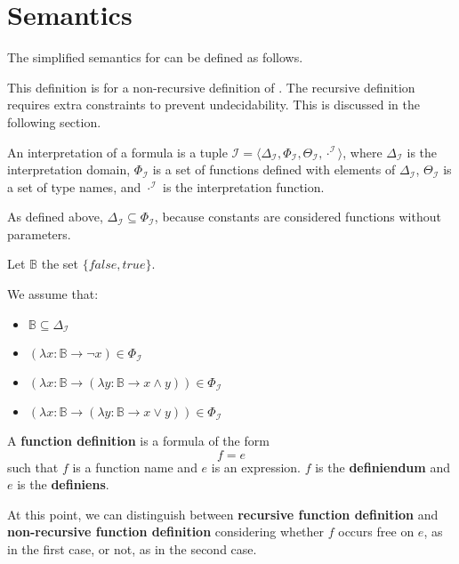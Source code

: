 \section{Semantics}

\newcommand{\I}[1]{\ensuremath{{#1}^{\mathcal{I}}}}

\newcommand{\DeltaI}{\ensuremath{\Delta _{\mathcal{I}}}}
\newcommand{\ThetaI}{\ensuremath{\Theta _{\mathcal{I}}}}
\newcommand{\PhiI}{\ensuremath{\Phi _{\mathcal{I}}}}

\newcommand{\lambd}[2]{\ensuremath{(\lambda {#1} \to {#2})}}

The simplified semantics for \Soda can be defined as follows.

This definition is for a non-recursive definition of \Soda.
The recursive definition requires extra constraints to prevent undecidability.
This is discussed in the following section.

An interpretation of a \Soda formula is a tuple $\mathcal{I} = \langle \DeltaI, \PhiI, \ThetaI, \I{\cdot} \rangle$, where $\DeltaI$ is the interpretation domain, $\PhiI$ is a set of functions defined with elements of $\DeltaI$, $\ThetaI$ is a set of type names, and $\I{\cdot}$ is the interpretation function.

As defined above, $\DeltaI \subseteq \PhiI$, because constants are considered functions without parameters.

Let $\mathbb{B}$ the set $\{false, true\}$.

We assume that:
\begin{itemize}
    \item $\mathbb{B} \subseteq \DeltaI$
    \item $\lambd{x: \mathbb{B}}{\lnot x} \in \PhiI$
    \item $\lambd{x: \mathbb{B}}{\lambd{y: \mathbb{B}}{x \land y}} \in \PhiI$
    \item $\lambd{x: \mathbb{B}}{\lambd{y: \mathbb{B}}{x \lor y}} \in \PhiI$
\end{itemize}

A \textbf{function definition} is a formula of the form
\[f = e\]
such that $f$ is a function name and $e$ is an expression.
$f$ is the \textbf{definiendum} and $e$ is the \textbf{definiens}.


At this point, we can distinguish between \textbf{recursive function definition} and \textbf{non-recursive function definition} considering whether $f$ occurs free on $e$,
as in the first case, or not, as in the second case.

